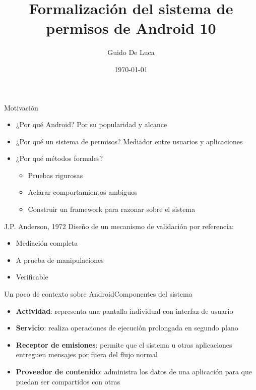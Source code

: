 \documentclass[pdf, handout]{beamer} %
\title{Formalización del sistema de permisos de Android 10}
\author[Universidad Nacional de Rosario]{Guido De Luca}
\institute{Universidad Nacional de Rosario}
\date{\today}
\begin{document}


\begin{frame}[plain]
    \titlepage
\end{frame}

\begin{frame}{Motivación}
    \begin{itemize}
        \item ¿Por qué Android? \pause Por su popularidad y alcance \pause
        \item ¿Por qué un sistema de permisos? \pause Mediador entre usuarios y aplicaciones \pause
        \item ¿Por qué métodos formales? \pause
              \begin{itemize}[<+->]
                  \item Pruebas rigurosas
                  \item Aclarar comportamientos ambiguos
                  \item Construir un framework para razonar sobre el sistema
              \end{itemize}
    \end{itemize}
\end{frame}

\begin{frame}{J.P. Anderson, 1972}
    Diseño de un mecanismo de validación por referencia:
    \pause
    \begin{itemize}[<+->]
        \item Mediación completa
        \item A prueba de manipulaciones
        \item Verificable
    \end{itemize}
\end{frame}


\begin{frame}{Un poco de contexto sobre Android}{Componentes del sistema}
    \begin{itemize}[<+->]
        \item \textbf{Actividad}: representa una pantalla individual con interfaz de usuario
        \item \textbf{Servicio}: realiza operaciones de ejecución prolongada en segundo plano
        \item \textbf{Receptor de emisiones}: permite que el sistema u otras aplicaciones entreguen
              mensajes por fuera del flujo normal
        \item \textbf{Proveedor de contenido}: administra los datos de una aplicación para que
              puedan ser compartidos con otras
    \end{itemize}
\end{frame}
\end{document}
